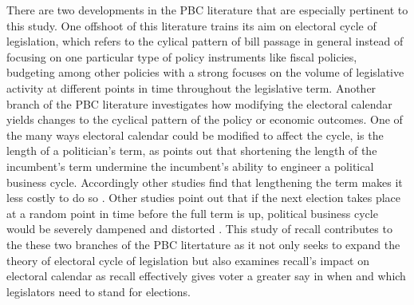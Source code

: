 \documentclass{article}
\begin{document}
		
		There are two developments in the PBC literature that are especially pertinent to this study.
		One offshoot of
		this
		literature
		trains its aim on
		electoral cycle of legislation,
		which refers to
		the cylical pattern of bill passage
		in general
		\autocite{lagonaOppositeCyclesLaws,
			lagonaPoliticalLegislationCycle2008,
			brechlerPoliticalLegislationCycle2014,
			wittmanMythDemocraticFailure1995}
		instead of focusing on one particular type of policy instruments
		like fiscal policies, budgeting among other policies
		with a strong focuses on
		the volume of legislative activity at different points in time
		throughout the legislative term.
		Another branch of the PBC literature investigates how
		modifying the electoral calendar
		yields changes to the cyclical pattern of the policy or economic outcomes.
		One of the many ways electoral calendar could be modified to affect the cycle,
		is the length of a politician's term,
		as
		\citeauthor{nordhausPoliticalBusinessCycle1975}
		\autocite*{nordhausPoliticalBusinessCycle1975}
		points out that shortening the length of the incumbent's term
		undermine the incumbent's ability to engineer a political business cycle.
		Accordingly other studies find that lengthening the term
		makes it less costly to do so
		\autocite
		{amacherCyclesSenatorialVoting1978,
			macraePoliticalModelBusiness1977}.
		Other studies
		point out that if the next election takes place
		at a random point in time before the full term is up,
		political business cycle would be severely dampened and distorted
		\autocite{ginsburghRandomTimingElections1983,lindbeckStabilizationPolicyOpen1976}.
		This
		study of recall contributes to the these two branches of the
		PBC
		litertature
		as it
		not only seeks to expand the theory
		of electoral cycle of legislation
		but also examines recall's impact on electoral calendar
		as recall effectively gives voter
		a greater say in when and which legislators
		need to stand for elections.
		
		
		
		
		
		
		
\end{document}
